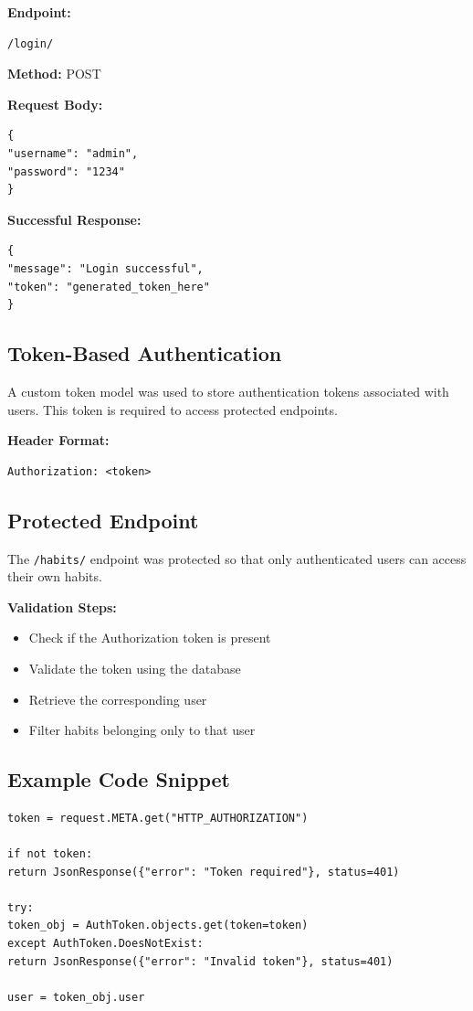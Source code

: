 \documentclass[12pt]{article}
\begin{document}
\textbf{Endpoint:}
\begin{verbatim}
/login/
\end{verbatim}

\textbf{Method:} POST

\textbf{Request Body:}
\begin{verbatim}
{
"username": "admin",
"password": "1234"
}
\end{verbatim}

\textbf{Successful Response:}
\begin{verbatim}
{
"message": "Login successful",
"token": "generated_token_here"
}
\end{verbatim}

\subsection{Token-Based Authentication}
A custom token model was used to store authentication tokens associated with users. This token is required to access protected endpoints.

\textbf{Header Format:}
\begin{verbatim}
Authorization: <token>
\end{verbatim}

\subsection{Protected Endpoint}
The \texttt{/habits/} endpoint was protected so that only authenticated users can access their own habits.

\textbf{Validation Steps:}
\begin{itemize}
\item Check if the Authorization token is present
\item Validate the token using the database
\item Retrieve the corresponding user
\item Filter habits belonging only to that user
\end{itemize}

\subsection{Example Code Snippet}
\begin{verbatim}
token = request.META.get("HTTP_AUTHORIZATION")

if not token:
return JsonResponse({"error": "Token required"}, status=401)

try:
token_obj = AuthToken.objects.get(token=token)
except AuthToken.DoesNotExist:
return JsonResponse({"error": "Invalid token"}, status=401)

user = token_obj.user
\end{verbatim}
\end{document}
